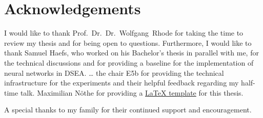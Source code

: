 \chapter*{Acknowledgements}

I would like to thank Prof.~Dr.~Dr.~Wolfgang~Rhode for taking the time to
review my thesis
and for being open to questions.
Furthermore,
I would like to thank Samuel Haefs,
who worked on his Bachelor's thesis in parallel with me,
for the technical discussions
and for providing a baseline for the implementation of neural networks in DSEA.
… the chair E5b for providing the technical infrastructure for the experiments
and their helpful feedback regarding my half-time talk.
Maximilian Nöthe for providing a \href{https://github.com/maxnoe/tudothesis}{\LaTeX{} template} for this thesis.


A special thanks to my family for their continued support and encouragement.
